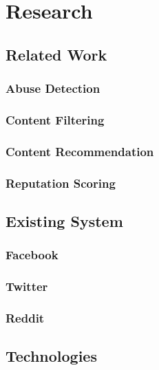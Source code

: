 \chapter{Research}
\label{Chapter:Research}

\section{Related Work}
\subsection{Abuse Detection}
\subsection{Content Filtering}
\subsection{Content Recommendation}
\subsection{Reputation Scoring}

\section{Existing System}
\subsection{Facebook}
\subsection{Twitter}
\subsection{Reddit}

\section{Technologies}